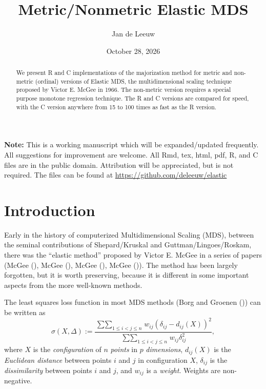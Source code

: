 \documentclass[
  12pt,
  letterpaper,
  DIV=11,
  numbers=noendperiod]{scrartcl}
\title{Metric/Nonmetric Elastic MDS}
\author{Jan de Leeuw}
\date{October 28, 2026}
\renewcommand*\contentsname{Table of contents}
\newcommand\contentsname{Table of contents}
\begin{document}
\maketitle
\begin{abstract}
We present R and C implementations of the majorization method for metric
and non-metric (ordinal) versions of Elastic MDS, the multidimensional
scaling technique proposed by Victor E. McGee in 1966. The non-metric
version requires a special purpose monotone regression technique. The R
and C versions are compared for speed, with the C version anywhere from
15 to 100 times as fast as the R version.
\end{abstract}

\renewcommand*\contentsname{Table of contents}
{
\setcounter{tocdepth}{3}
\tableofcontents
}

\textbf{Note:} This is a working manuscript which will be
expanded/updated frequently. All suggestions for improvement are
welcome. All Rmd, tex, html, pdf, R, and C files are in the public
domain. Attribution will be appreciated, but is not required. The files
can be found at \url{https://github.com/deleeuw/elastic}

\section{Introduction}\label{introduction}

Early in the history of computerized Multidimensional Scaling (MDS),
between the seminal contributions of Shepard/Kruskal and
Guttman/Lingoes/Roskam, there was the ``elastic method'' proposed by
Victor E. McGee in a series of papers (McGee
(), McGee (),
McGee (), McGee
()). The method has been largely forgotten,
but it is worth preserving, because it is different in some important
aspects from the more well-known methods.

The least squares loss function in most MDS methods (Borg and Groenen
()) can be written as
\begin{equation}
  \sigma(X,\Delta) := \frac{\mathop{\sum\sum}_{1 \leq i<j \leq n}w_{ij}(\delta_{ij} - d_{ij}(X))^2}{\mathop{\sum\sum}_{1 \leq i<j \leq n}w_{ij}\delta_{ij}^2},\label{eq-kruskal}
\end{equation} where \(X\) is the \emph{configuration} of \(n\)
\emph{points} in \(p\) \emph{dimensions}, \(d_{ij}(X)\) is the
\emph{Euclidean distance} between points \(i\) and \(j\) in
configuration \(X\), \(\delta_{ij}\) is the \emph{dissimilarity} between
points \(i\) and \(j\), and \(w_{ij}\) is a \emph{weight}. Weights are
non-negative.
\end{document}
